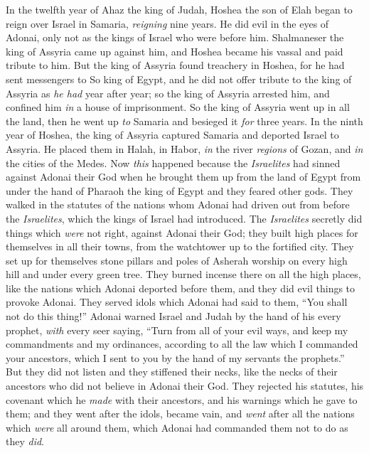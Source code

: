 \begin{biblechapter} %
 In the twelfth year of Ahaz the king of Judah, Hoshea the son of Elah began to reign over Israel in Samaria, \textit{reigning} nine years.
\verse He did evil in the eyes of Adonai, only not as the kings of Israel who were before him.
\verse Shalmaneser the king of Assyria came up against him, and Hoshea became his vassal and paid tribute to him.
\verse But the king of Assyria found treachery in Hoshea, for he had sent messengers to So king of Egypt, and he did not offer tribute to the king of Assyria as \textit{he had} year after year; so the king of Assyria arrested him, and confined him \textit{in} a house of imprisonment.
\verse So the king of Assyria went up in all the land, then he went up \textit{to} Samaria and besieged it \textit{for} three years.
 In the ninth year of Hoshea, the king of Assyria captured Samaria and deported Israel to Assyria. He placed them in Halah, in Habor, \textit{in} the river \textit{regions} of Gozan, and \textit{in} the cities of the Medes.
\verse Now \textit{this} happened because the \textit{Israelites} had sinned against Adonai their God when he brought them up from the land of Egypt from under the hand of Pharaoh the king of Egypt and they feared other gods.
\verse They walked in the statutes of the nations whom Adonai had driven out from before the \textit{Israelites}, which the kings of Israel had introduced.
\verse The \textit{Israelites} secretly did things which \textit{were} not right, against Adonai their God; they built high places for themselves in all their towns, from the watchtower up to the fortified city.
\verse They set up for themselves stone pillars and poles of Asherah worship on every high hill and under every green tree.
\verse They burned incense there on all the high places, like the nations which Adonai deported before them, and they did evil things to provoke Adonai.
\verse They served idols which Adonai had said to them, “You shall not do this thing!”
\verse Adonai warned Israel and Judah by the hand of his every prophet, \textit{with} every seer saying, “Turn from all of your evil ways, and keep my commandments and my ordinances, according to all the law which I commanded your ancestors, which I sent to you by the hand of my servants the prophets.”
\verse But they did not listen and they stiffened their necks, like the necks of their ancestors who did not believe in Adonai their God.
\verse They rejected his statutes, his covenant which he \textit{made} with their ancestors, and his warnings which he gave to them; and they went after the idols, became vain, and \textit{went} after all the nations which \textit{were} all around them, which Adonai had commanded them not to do as they \textit{did}.

\end{biblechapter}
